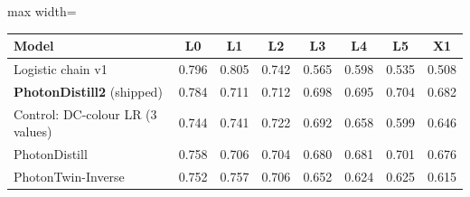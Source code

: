 {\footnotesize
\setlength{\tabcolsep}{4pt}
\begin{adjustbox}{max width=\linewidth}
\begin{tabular}{p{4cm}ccccccc}
\toprule
Model & L0 & L1 & L2 & L3 & L4 & L5 & X1 \\
\midrule
Logistic chain v1 & 0.796 & 0.805 & 0.742 & 0.565 & 0.598 & 0.535 & 0.508 \\
\textbf{PhotonDistill2} (shipped) & 0.784 & 0.711 & 0.712 & 0.698 & 0.695 & 0.704 & 0.682 \\
Control: DC-colour LR (3 values) & 0.744 & 0.741 & 0.722 & 0.692 & 0.658 & 0.599 & 0.646 \\
PhotonDistill & 0.758 & 0.706 & 0.704 & 0.680 & 0.681 & 0.701 & 0.676 \\
PhotonTwin-Inverse & 0.752 & 0.757 & 0.706 & 0.652 & 0.624 & 0.625 & 0.615 \\
\bottomrule
\end{tabular}
\end{adjustbox}
}
